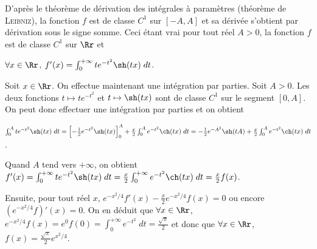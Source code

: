 {{D'après le théorème de dérivation des intégrales à paramètres (théorème de \textsc{Leibniz}), la fonction $f$ est de classe $C^1$ sur $[-A,A]$ et sa dérivée s'obtient par dérivation sous le signe somme. Ceci étant vrai pour tout réel $A>0$, la fonction $f$ est de classe $C^1$ sur $\Rr$ et

\begin{center}
$\forall x\in\Rr$, $f'(x)=\int_{0}^{+\infty}te^{-t^2}\sh(tx)\;dt$.
\end{center}

Soit $x\in\Rr$. On effectue maintenant une intégration par parties. Soit $A>0$. Les deux fonctions $t\mapsto te^{-t^2}$ et $t\mapsto\sh(tx)$ sont de classe $C^1$ sur le segment $[0,A]$. On peut donc effectuer une intégration par parties et on obtient

\begin{center}
$\int_{0}^{A}te^{-t^2}\sh(tx)\;dt=\left[-\frac{1}{2}e^{-t^2}\sh(tx)\right]_0^A+\frac{x}{2}\int_{0}^{A}e^{-t^2}\ch(tx)\;dt=-\frac{1}{2}e^{-A^2}\sh(tA)+\frac{x}{2}\int_{0}^{A}e^{-t^2}\ch(tx)\;dt$.
\end{center}

Quand $A$ tend vers $+\infty$, on obtient $f'(x)=\int_{0}^{+\infty}te^{-t^2}\sh(tx)\;dt=\frac{x}{2}\int_{0}^{+\infty}e^{-t^2}\ch(tx)\;dt=\frac{x}{2}f(x)$.

Ensuite, pour tout réel $x$, $e^{-x^2/4}f'(x)-\frac{x}{2}e^{-x^2/4}f(x)=0$ ou encore $(e^{-x^2/4}f)'(x)=0$. On en déduit que $\forall x\in\Rr$, $e^{-x^2/4}f(x)=e^0f(0)=\int_{0}^{+\infty}e^{-t^2}\;dt=\frac{\sqrt{\pi}}{2}$ et donc que $\forall x\in\Rr$, $f(x)=\frac{\sqrt{\pi}}{2}e^{x^2/4}$.

\begin{center}
\end{center}}
}